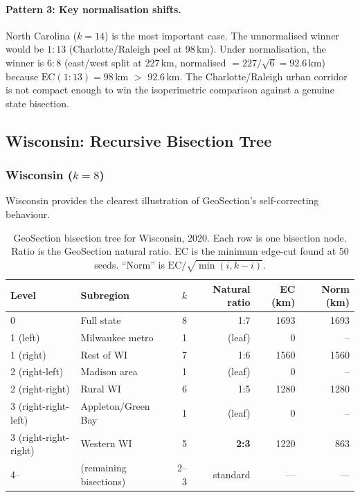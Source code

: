\paragraph{Pattern 3: Key normalisation shifts.}
North Carolina ($k=14$) is the most important case.
The unnormalised winner would be $1:13$ (Charlotte/Raleigh peel at 98\,km).
Under normalisation, the winner is $6:8$ (east/west split at 227\,km,
normalised $= 227/\sqrt{6} = 92.6$\,km) because
$\mathrm{EC}(1:13) = 98$\,km $>$ $92.6$\,km.
The Charlotte/Raleigh urban corridor is not compact enough to win
the isoperimetric comparison against a genuine state bisection.

\subsection{Wisconsin: Recursive Bisection Tree}
\label{sec:case-studies}

\subsubsection*{Wisconsin ($k=8$)}

Wisconsin provides the clearest illustration of GeoSection's self-correcting
behaviour.

\begin{table}[h]
\centering
\caption{GeoSection bisection tree for Wisconsin, 2020.
  Each row is one bisection node. Ratio is the GeoSection natural ratio.
  EC is the minimum edge-cut found at 50 seeds. ``Norm'' is $\mathrm{EC}/\sqrt{\min(i,k-i)}$.}
\label{tab:wi-tree}
\begin{tabular}{llrrrr}
\toprule
Level & Subregion & $k$ & Natural ratio & EC (km) & Norm (km) \\
\midrule
0 & Full state & 8 & 1:7 & 1693 & 1693 \\
1 (left) & Milwaukee metro & 1 & (leaf) & 0 & -- \\
1 (right) & Rest of WI & 7 & 1:6 & 1560 & 1560 \\
2 (right-left) & Madison area & 1 & (leaf) & 0 & -- \\
2 (right-right) & Rural WI & 6 & 1:5 & 1280 & 1280 \\
3 (right-right-left) & Appleton/Green Bay & 1 & (leaf) & 0 & -- \\
3 (right-right-right) & Western WI & 5 & \textbf{2:3} & 1220 & 863 \\
4-- & (remaining bisections) & 2--3 & standard & --- & --- \\
\bottomrule
\end{tabular}
\end{table}

